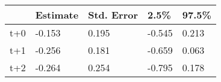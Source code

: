 \begin{tabular}{lllll}
  \toprule
  & Estimate & Std. Error & 2.5\% & 97.5\% \\ 
  \midrule
t+0 & -0.153 & 0.195 & -0.545 & 0.213 \\ 
  t+1 & -0.256 & 0.181 & -0.659 & 0.063 \\ 
  t+2 & -0.264 & 0.254 & -0.795 & 0.178 \\ 
   \bottomrule
\end{tabular}
